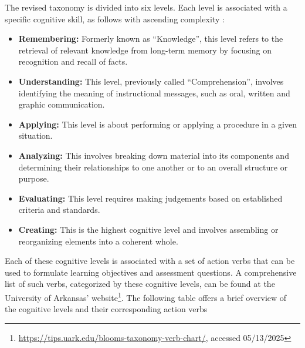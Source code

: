 The revised taxonomy \cite{krathwohl_revision_2002} is divided into six levels. Each level is associated with a specific cognitive skill, as follows with ascending complexity :

\begin{itemize}
   \item \textbf{Remembering:} Formerly known as \enquote{Knowledge}, this level refers to the retrieval of relevant knowledge from long-term memory by focusing on recognition and recall of facts.
   \item \textbf{Understanding:} This level, previously called \enquote{Comprehension}, involves identifying the meaning of instructional messages, such as oral, written and graphic communication.
   \item \textbf{Applying:} This level is about performing or applying a procedure in a given situation.
   \item \textbf{Analyzing:} This involves breaking down material into its components and determining their relationships to one another or to an overall structure or purpose.
   \item \textbf{Evaluating:} This level requires making judgements based on established criteria and standards.
   \item \textbf{Creating:} This is the highest cognitive level and involves assembling or reorganizing elements into a coherent whole.
\end{itemize}

Each of these cognitive levels is associated with a set of action verbs that can be used to formulate learning objectives and assessment questions. A comprehensive list of such verbs, categorized by these cognitive levels, can be found at the University of Arkansas' website\footnote{\url{https://tips.uark.edu/blooms-taxonomy-verb-chart/}, accessed 05/13/2025}. The following table offers a brief overview of the cognitive levels and their corresponding action verbs 


